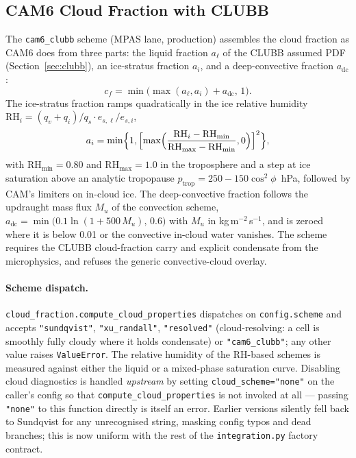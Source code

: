\documentclass[11pt,twoside]{report}
\begin{document}
\subsection{CAM6 Cloud Fraction with CLUBB}
\label{sec:cam6-clouds}

The \texttt{cam6\_clubb} scheme (MPAS lane, production) assembles the cloud
fraction as CAM6 does from three parts: the liquid fraction $a_{\ell}$ of the
CLUBB assumed PDF (Section~\ref{sec:clubb}), an ice-stratus fraction
$a_i$, and a deep-convective fraction $a_{\mathrm{dc}}$:
\begin{equation}
  c_f=\min\bigl(\max(a_\ell,a_i)+a_{\mathrm{dc}},\,1\bigr).
\end{equation}
The ice-stratus fraction ramps quadratically in the ice relative humidity
$\mathrm{RH}_i=(q_v+q_i)/q_s\cdot e_{s,\ell}/e_{s,i}$,
\begin{equation}
  a_i=\min\Bigl\{1,\Bigl[\max\Bigl(\frac{\mathrm{RH}_i-\mathrm{RH}_{\min}}
  {\mathrm{RH}_{\max}-\mathrm{RH}_{\min}},0\Bigr)\Bigr]^2\Bigr\},
\end{equation}
with $\mathrm{RH}_{\min}=0.80$ and $\mathrm{RH}_{\max}=1.0$ in the
troposphere and a step at ice saturation above an analytic tropopause
$p_{\mathrm{trop}}=250-150\cos^2\phi$~hPa, followed by CAM's limiters on
in-cloud ice.  The deep-convective fraction follows the updraught mass flux
$M_u$ of the convection scheme,
$a_{\mathrm{dc}}=\min\bigl(0.1\ln(1+500\,M_u),\,0.6\bigr)$ with $M_u$ in
kg\,m$^{-2}$\,s$^{-1}$, and is zeroed
where it is below 0.01 or the convective in-cloud water vanishes.  The scheme
requires the CLUBB cloud-fraction carry and explicit condensate from the
microphysics, and refuses the generic convective-cloud overlay.

\paragraph{Scheme dispatch.}
\texttt{cloud\_fraction.compute\_cloud\_properties} dispatches on
\texttt{config.scheme} and accepts \texttt{"sundqvist"},
\texttt{"xu\_randall"}, \texttt{"resolved"} (cloud-resolving: a cell is
smoothly fully cloudy where it holds condensate) or \texttt{"cam6\_clubb"};
any other value raises \texttt{ValueError}.  The relative humidity of the
RH-based schemes is measured against either the liquid or a mixed-phase
saturation curve.
Disabling cloud diagnostics is handled \emph{upstream} by setting
\texttt{cloud\_scheme="none"} on the caller's config so that
\texttt{compute\_cloud\_properties} is not invoked at all --- passing
\texttt{"none"} to this function directly is itself an error.  Earlier
versions silently fell back to Sundqvist for any unrecognised string,
masking config typos and dead branches; this is now uniform with the
rest of the \texttt{integration.py} factory contract.
\end{document}
